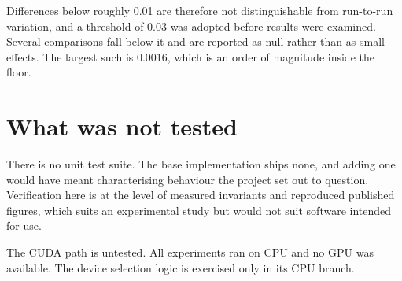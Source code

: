 Differences below roughly 0.01 are therefore not distinguishable from
run-to-run variation, and a threshold of 0.03 was adopted before results were
examined. Several comparisons fall below it and are reported as null rather than
as small effects. The largest such is 0.0016, which is an order of magnitude
inside the floor.

\section{What was not tested}
\label{sec:not-tested}

There is no unit test suite. The base implementation ships none, and adding one
would have meant characterising behaviour the project set out to question.
Verification here is at the level of measured invariants and reproduced
published figures, which suits an experimental study but would not suit
software intended for use.

The CUDA path is untested. All experiments ran on CPU and no GPU was available.
The device selection logic is exercised only in its CPU branch.
